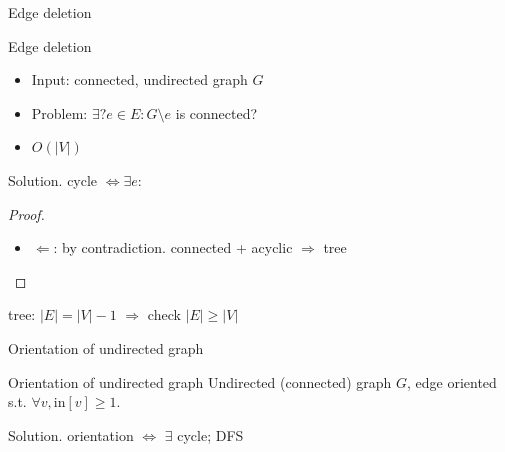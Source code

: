 \begin{frame}{Edge deletion}
  \begin{exampleblock}{Edge deletion }
    \begin{itemize}
      \item Input: connected, undirected graph $G$
      \item Problem: $\exists? e \in E: G \setminus e$ is connected?
      \item $O(|V|)$
    \end{itemize}
  \end{exampleblock}

  \begin{block}{Solution.}
    cycle $\iff \exists e$:
    \begin{proof}
      \begin{itemize}
	\item $\Leftarrow$: by contradiction. connected + acyclic $\Rightarrow$ tree
      \end{itemize}
    \end{proof}

    tree: $|E| = |V| - 1$ $\Rightarrow$ check $|E| \ge |V|$
  \end{block}
\end{frame}
\begin{frame}{Orientation of undirected graph}
  \begin{exampleblock}{Orientation of undirected graph }
    Undirected (connected) graph $G$, edge oriented s.t. $\forall v, \text{in}[v] \ge 1$.
  \end{exampleblock}

  \begin{block}{Solution.}
    orientation $\iff$ $\exists$ cycle; DFS
  \end{block}
\end{frame}

